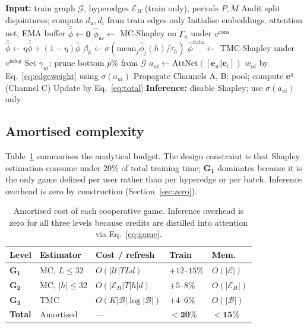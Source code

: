 \documentclass[final,5p,times,twocolumn]{elsarticle}
\begin{document}
\begin{algorithm}[t]
\caption{CoopGCN training}
\label{alg:coopgcn}
\small
\begin{algorithmic}[1]
\State \textbf{Input:} train graph $\mathcal{G}$, hyperedges $\mathcal{E}_H$
(train only), periods $P,M$
\State Audit split disjointness; compute $d_u,d_i$ from train edges only
\State Initialise embeddings, attention net, EMA buffer
$\bar{\hat{\phi}} \gets \mathbf{0}$
    \State $\hat{\phi}_{ui} \gets$ MC-Shapley on $\Gamma_u$ under
    $v^{\mathrm{cons}}$ 
    \State $\bar{\hat{\phi}} \gets \eta \bar{\hat{\phi}} + (1-\eta)\hat{\phi}$
    \State $\beta_h \gets \sigma(\mathrm{mean}_j \hat{\phi}_j(h)/\tau_h)$
  \EndIf
    \State $\hat{\phi}^{\mathrm{data}} \gets$ TMC-Shapley under
    $v^{\mathrm{ndcg}}$ 
    \State Set $\gamma_{ui}$; prune bottom $p\%$ from $\mathcal{G}$
  \EndIf
    \State $a_{ui} \gets \mathrm{AttNet}([\mathbf{e}_u \Vert \mathbf{e}_i])$
    \State $w_{ui}$ by Eq.~\eqref{eq:edgeweight} using $\sigma(a_{ui})$
    \State Propagate Channels A, B; pool; compute $\mathbf{e}^{g}$ (Channel C)
    \State Update by Eq.~\eqref{eq:total}
  \EndFor
\EndFor
\State \textbf{Inference:} disable Shapley; use $\sigma(a_{ui})$ only
\end{algorithmic}
\end{algorithm}

\subsection{Amortised complexity}
\label{sec:amortised}

Table~\ref{tab:complexity} summarises the analytical budget. The design
constraint is that Shapley estimation consume under 20\% of total training
time; $\mathbf{G_1}$ dominates because it is the only game defined per user
rather than per hyperedge or per batch. Inference overhead is zero by
construction (Section~\ref{sec:zero}).

\begin{table}[t]
\centering
\caption{Amortised cost of each cooperative game. Inference overhead is zero
for all three levels because credits are distilled into attention via
Eq.~\eqref{eq:game}.}
\label{tab:complexity}
\footnotesize
\begin{tabular}{lllll}
\toprule
\textbf{Level} & \textbf{Estimator} & \textbf{Cost / refresh} &
\textbf{Train} & \textbf{Mem.} \\
\midrule
$\mathbf{G_1}$ & MC, $L\le32$ & $O(|\mathcal{U}| T L d)$ & $+12$--$15\%$ &
$O(|\mathcal{E}|)$ \\
$\mathbf{G_2}$ & MC, $|h|\le32$ & $O(|\mathcal{E}_H| T |h| d)$ & $+5$--$8\%$ &
$O(|\mathcal{E}_H|)$ \\
$\mathbf{G_3}$ & TMC & $O(K |\mathcal{B}| \log |\mathcal{B}|)$ & $+4$--$6\%$ &
$O(|\mathcal{B}|)$ \\
\midrule
\textbf{Total} & Amortised & --- & $\mathbf{<20\%}$ & $\mathbf{<15\%}$ \\
\bottomrule
\end{tabular}
\end{table}
\end{document}

